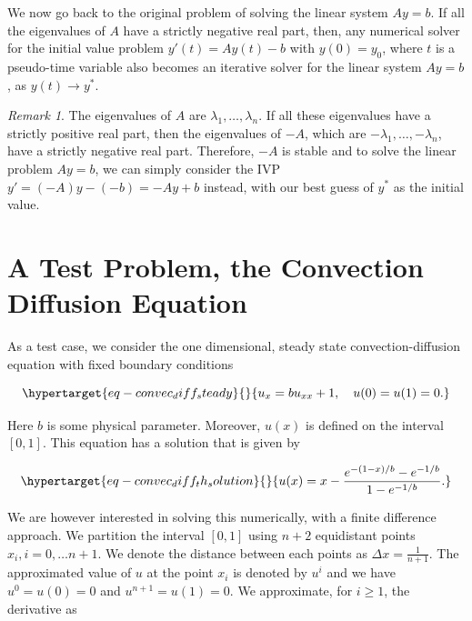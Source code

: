 \documentclass[
  letterpaper,
]{report}
\theoremstyle{plain}
\theoremstyle{definition}
\theoremstyle{definition}
\theoremstyle{remark}
\newtheorem*{remark}{Remark}
\begin{document}
We now go back to the original problem of solving the linear system
\(Ay = b\). If all the eigenvalues of \(A\) have a strictly negative
real part, then, any numerical solver for the initial value problem
\(y'(t) = Ay(t) - b\) with \(y(0) = y_0\), where \(t\) is a pseudo-time
variable also becomes an iterative solver for the linear system
\(Ay = b\), as \(y(t) \to y^*\).

\begin{remark}

The eigenvalues of \(A\) are \(\lambda_1, \dots , \lambda_n\). If all
these eigenvalues have a strictly positive real part, then the
eigenvalues of \(-A\), which are \(-\lambda_1, \dots , -\lambda_n\),
have a strictly negative real part. Therefore, \(-A\) is stable and to
solve the linear problem \(Ay = b\), we can simply consider the IVP
\(y' = (-A)y - (-b) = -Ay+b\) instead, with our best guess of \(y^*\) as
the initial value.

\end{remark}


\hypertarget{a-test-problem-the-convection-diffusion-equation}{%
\chapter{A Test Problem, the Convection Diffusion
Equation}\label{a-test-problem-the-convection-diffusion-equation}}

As a test case, we consider the one dimensional, steady state
convection-diffusion equation with fixed boundary conditions

\begin{equation}\protect\hypertarget{eq-convec_diff_steady}{}{
    u_x = bu_{xx} + 1 ,  \quad u(0) = u(1) = 0.
}\label{eq-convec_diff_steady}\end{equation}

Here \(b\) is some physical parameter. Moreover, \(u(x)\) is defined on
the interval \([0,1]\). This equation has a solution that is given by

\begin{equation}\protect\hypertarget{eq-convec_diff_th_solution}{}{
u(x) = x - \frac{e^{-(1-x)/b} - e^{-1/b}}{1-e^{-1/b}}.
}\label{eq-convec_diff_th_solution}\end{equation}

We are however interested in solving this numerically, with a finite
difference approach. We partition the interval \([0,1]\) using \(n+2\)
equidistant points \(x_i, i = 0, \dots n+1\). We denote the distance
between each points as \(\Delta x = \frac{1}{n+1}\). The approximated
value of \(u\) at the point \(x_i\) is denoted by \(u^i\) and we have
\(u^0 = u(0) = 0\) and \(u^{n+1} = u(1) = 0\). We approximate, for
\(i \geq 1\), the derivative as
\end{document}
